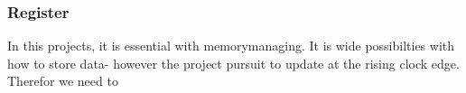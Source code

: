 \subsubsection{Register} \label{Register}
In this projects, it is essential with memorymanaging. It is wide possibilties with how to store data- however the project pursuit to update at the rising clock edge. Therefor we need to